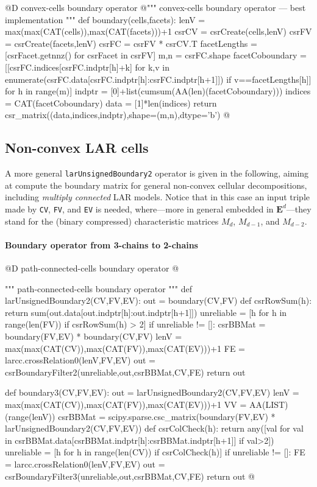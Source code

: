 \documentclass[11pt,oneside]{article}	%
\begin{document}
@D convex-cells boundary operator
@{""" convex-cells boundary operator --- best implementation """
def boundary(cells,facets):
    lenV = max(max(CAT(cells)),max(CAT(facets)))+1
    csrCV = csrCreate(cells,lenV)
    csrFV = csrCreate(facets,lenV)
    csrFC = csrFV * csrCV.T
    facetLengths = [csrFacet.getnnz() for csrFacet in csrFV]
    m,n = csrFC.shape
    facetCoboundary = [[csrFC.indices[csrFC.indptr[h]+k] 
        for k,v in enumerate(csrFC.data[csrFC.indptr[h]:csrFC.indptr[h+1]]) 
            if v==facetLengths[h]] for h in range(m)]
    indptr = [0]+list(cumsum(AA(len)(facetCoboundary)))
    indices = CAT(facetCoboundary)
    data = [1]*len(indices)
    return csr_matrix((data,indices,indptr),shape=(m,n),dtype='b')
@}


\subsection{Non-convex LAR cells}

A more general \texttt{larUnsignedBoundary2} operator is given in the following, aiming at compute the boundary matrix for general non-convex cellular decompositions, including \emph{multiply connected} LAR models.
Notice that in this case an input triple made by \texttt{CV}, \texttt{FV}, and \texttt{EV} is needed,
where---more in general embedded in $\mathbf{E}^d$---they stand for the (binary compressed) characteristic matrices $M_d$, $M_{d-1}$, and $M_{d-2}$.

\paragraph{Boundary operator from 3-chains to 2-chains}

@D path-connected-cells boundary operator
@{""" path-connected-cells boundary operator """
def larUnsignedBoundary2(CV,FV,EV):
    out = boundary(CV,FV)
    def csrRowSum(h): 
        return sum(out.data[out.indptr[h]:out.indptr[h+1]])    
    unreliable = [h for h in range(len(FV)) if csrRowSum(h) > 2]
    if unreliable != []:
        csrBBMat = boundary(FV,EV) * boundary(CV,FV)
        lenV = max(max(CAT(CV)),max(CAT(FV)),max(CAT(EV)))+1
        FE = larcc.crossRelation0(lenV,FV,EV)
        out = csrBoundaryFilter2(unreliable,out,csrBBMat,CV,FE)
    return out

def boundary3(CV,FV,EV):
    out = larUnsignedBoundary2(CV,FV,EV)
    lenV = max(max(CAT(CV)),max(CAT(FV)),max(CAT(EV)))+1
    VV = AA(LIST)(range(lenV))
    csrBBMat = scipy.sparse.csc_matrix(boundary(FV,EV) * larUnsignedBoundary2(CV,FV,EV))
    def csrColCheck(h): 
        return any([val for val in csrBBMat.data[csrBBMat.indptr[h]:csrBBMat.indptr[h+1]] if val>2])    
    unreliable = [h for h in range(len(CV)) if csrColCheck(h)]
    if unreliable != []:
        FE = larcc.crossRelation0(lenV,FV,EV)
        out = csrBoundaryFilter3(unreliable,out,csrBBMat,CV,FE)
    return out
@}
\end{document}
